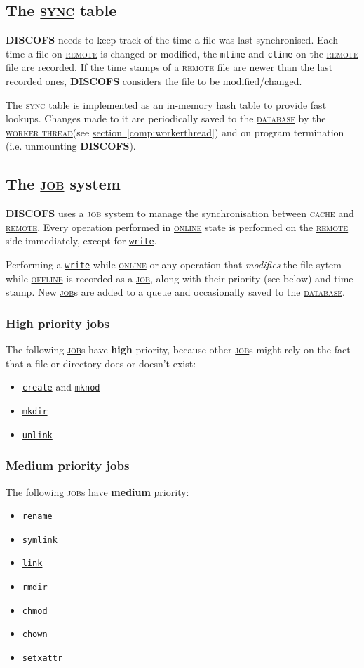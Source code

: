 \documentclass[a4paper]{article}
\newcommand{\software}[1]{\textsc{\textbf{#1}}\xspace}
\newcommand{\discofs}{\software{DISCOFS}}
\newcommand{\component}[1]{\hyperref[comp:#1]{\textsc{#1}}\xspace}
\newcommand{\job}{\component{job}}
\newcommand{\jobs}{\job{}s\xspace}
\newcommand{\sync}{\component{sync}}
\newcommand{\cache}{\component{cache}}
\newcommand{\remote}{\component{remote}}
\newcommand{\database}{\component{database}}
\newcommand{\online}{\component{online}}
\newcommand{\offline}{\component{offline}}
\newcommand{\workerthread}{\hyperref[comp:workerthread]{\textsc{worker thread}}\xspace}
\newcommand{\fsopref}[1]{\hyperref[fsop:#1]{\texttt{#1}}}
\newcommand{\sectionref}[1]{\hyperref[#1]{section~\ref{#1}}}
\begin{document}
\subsection{The \sync table} %
\label{comp:sync}
\discofs needs to keep track of the time a file was last synchronised. Each time
a file on \remote is changed or modified, the \texttt{mtime} and \texttt{ctime} on
the \remote file are recorded. If the time stamps of a \remote file are newer than
the last recorded ones, \discofs considers the file to be modified/changed. 

The \sync table is implemented as an in-memory hash table to provide fast
lookups. Changes made to it are periodically saved to the \database by the
\workerthread (see \sectionref{comp:workerthread}) and on program termination
(i.e. unmounting \discofs).

\subsection{The \job system} %
\label{comp:job}
\discofs uses a \job system to manage the synchronisation between \cache and
\remote. 
Every operation performed in \online state is performed on the
\remote side immediately, except for \fsopref{write}.

Performing a \fsopref{write} while \online or any operation that
\emph{modifies} the file sytem while \offline is recorded as a \job, along with
their priority (see below) and time stamp. New \jobs are added to a queue and
occasionally saved to the \database.

\subsubsection{High priority jobs}
The following \jobs have \textbf{high} priority, because other \jobs might rely
on the fact that a file or directory does or doesn't exist:
\begin{itemize}
	\item \fsopref{create} and \fsopref{mknod}
	\item \fsopref{mkdir}
	\item \fsopref{unlink}
\end{itemize}

\subsubsection{Medium priority jobs}
The following \jobs have \textbf{medium} priority:
\begin{itemize}
	\item \fsopref{rename}
	\item \fsopref{symlink}
	\item \fsopref{link}
	\item \fsopref{rmdir}
	\item \fsopref{chmod}
	\item \fsopref{chown}
	\item \fsopref{setxattr}
\end{itemize}
\end{document}
